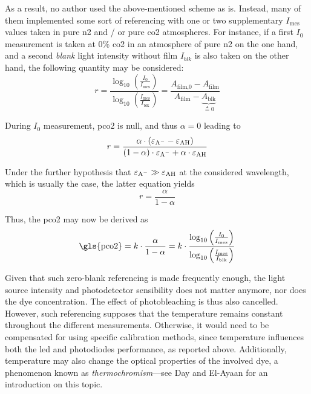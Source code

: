 As a result, no author used the above-mentioned scheme as is. Instead, many of them\cite{opitz1984, zhujun1984b, wolfbeis1988, he1995, marazuela1995, malins1998, wolfbeis1998, chu2008, chu2009, dansby2010, chu2017} implemented some sort of referencing with one or two supplementary $I_\text{mes}$ values taken in pure \gls{n2} and / or pure \gls{co2} atmospheres. For instance, if a first $I_{0}$ measurement is taken at 0\% \gls{co2} in an atmosphere of pure \gls{n2} on the one hand, and a second \emph{blank} light intensity without film $I_{blk}$ is also taken on the other hand, the following quantity may be considered:
\begin{equation}
	r = \frac{\log_{10}\left(\frac{I_0}{I_\text{mes}}\right)}{\log_{10}\left(\frac{I_\text{mes}}{I_\text{blk}}\right)} = \frac{A_\text{film,0} - A_\text{film}}{A_\text{film} - \underbrace{A_\text{blk}}_{\triangleq 0}}
\end{equation}

During $I_{0}$ measurement, \gls{pco2} is null, and thus $\alpha = 0$ leading to
\begin{equation}
	r = \frac{\alpha \cdot (\ce{\varepsilon_{A^-} - \varepsilon_{AH}})}{(1-\alpha)\cdot \ce{\varepsilon_{A^-} + \alpha\cdot \varepsilon_{AH}}}
\end{equation}

Under the further hypothesis that $\ce{\varepsilon_{A^-}} \gg \ce{\varepsilon_{AH}}$ at the considered wavelength, which is usually the case\cite{segawa2003, mills2009}, the latter equation yields
\begin{equation}
	r = \frac{\alpha}{1-\alpha}
\end{equation}

Thus, the \gls{pco2} may now be derived as
\begin{equation}
	\text{\gls{pco2}} = k \cdot \frac{\alpha}{1-\alpha} = k\cdot \frac{\log_{10}\left(\frac{I_0}{I_\text{mes}}\right)}{\log_{10}\left(\frac{I_\text{mes}}{I_\text{blk}}\right)}
\end{equation}

Given that such zero-blank referencing is made frequently enough, the light source intensity and photodetector sensibility does not matter anymore, nor does the dye concentration. The effect of photobleaching is thus also cancelled. However, such referencing supposes that the temperature remains constant throughout the different measurements. Otherwise, it would need to be compensated for using specific calibration methods, since temperature influences both the \gls{led} and photodiodes performance, as reported above. Additionally, temperature may also change the optical properties of the involved dye, a phenomenon known as \emph{thermochromism}---see Day and El-Ayaan for an introduction on this topic\cite{day1963, elayaan2001}.

